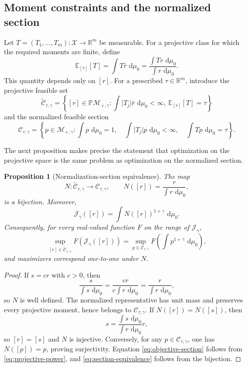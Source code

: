 \documentclass[pdflatex,sn-mathphys-num]{sn-jnl}
\theoremstyle{thmstyleone}
\newtheorem{proposition}{Proposition}
\theoremstyle{thmstyletwo}
\theoremstyle{thmstylethree}
\newcommand{\dd}{\,\mathrm{d}}
\newcommand{\R}{\mathbb{R}}
\newcommand{\E}{\mathbb{E}}
\newcommand{\calX}{\mathcal{X}}
\newcommand{\calM}{\mathcal{M}}
\newcommand{\calC}{\mathcal{C}}
\newcommand{\calJ}{\mathcal{J}}
\begin{document}
\subsection{Moment constraints and the normalized section}

Let $T=(T_1,\ldots,T_m):\calX\to\R^m$ be measurable. For a projective class for which the required moments are finite, define
\[
 \E_{[r]}[T]
 =\int T\bar r\,\dd\mu_0
 =\frac{\int Tr\,\dd\mu_0}{\int r\,\dd\mu_0}.
\]
This quantity depends only on $[r]$. For a prescribed $\tau\in\R^m$, introduce the projective feasible set
\[
 \widetilde{\calC}_{\tau,\gamma}
 =
 \left\{
 [r]\in\mathbb P\calM_{+,\gamma}:
 \int \lvert T_j\rvert\bar r\,\dd\mu_0<\infty,
 \ \E_{[r]}[T]=\tau
 \right\}
\]
and the normalized feasible section
\begin{equation}
\calC_{\tau,\gamma}
=
\left\{
 p\in\calM_{+,\gamma}:
 \int p\,\dd\mu_0=1,
 \quad
 \int \lvert T_j\rvert p\,\dd\mu_0<\infty,
 \quad
 \int Tp\,\dd\mu_0=\tau
\right\}.
\label{eq:feasible-set}
\end{equation}

The next proposition makes precise the statement that optimization on the projective space is the same problem as optimization on the normalized section.

\begin{proposition}[Normalization-section equivalence]\label{prop:normalization-section}
The map
\[
 N:\widetilde{\calC}_{\tau,\gamma}\to\calC_{\tau,\gamma},
 \qquad
 N([r])=\frac{r}{\int r\,\dd\mu_0},
\]
is a bijection. Moreover,
\begin{equation}
 \calJ_\gamma([r])
 =\int N([r])^{1+\gamma}\,\dd\mu_0.
\label{eq:objective-section}
\end{equation}
Consequently, for every real-valued function $F$ on the range of $\calJ_\gamma$,
\begin{equation}
 \sup_{[r]\in\widetilde{\calC}_{\tau,\gamma}}
 F\!\left(\calJ_\gamma([r])\right)
 =
 \sup_{p\in\calC_{\tau,\gamma}}
 F\!\left(\int p^{1+\gamma}\,\dd\mu_0\right),
\label{eq:section-equivalence}
\end{equation}
and maximizers correspond one-to-one under $N$.
\end{proposition}

\begin{proof}
If $s=cr$ with $c>0$, then
\[
 \frac{s}{\int s\,\dd\mu_0}
 =\frac{cr}{c\int r\,\dd\mu_0}
 =\frac{r}{\int r\,\dd\mu_0},
\]
so $N$ is well defined. The normalized representative has unit mass and preserves every projective moment, hence belongs to $\calC_{\tau,\gamma}$. If $N([r])=N([s])$, then
\[
 s=\frac{\int s\,\dd\mu_0}{\int r\,\dd\mu_0}r,
\]
so $[r]=[s]$ and $N$ is injective. Conversely, for any $p\in\calC_{\tau,\gamma}$, one has $N([p])=p$, proving surjectivity. Equation \cref{eq:objective-section} follows from \cref{eq:projective-power}, and \cref{eq:section-equivalence} follows from the bijection.
\end{proof}
\end{document}
